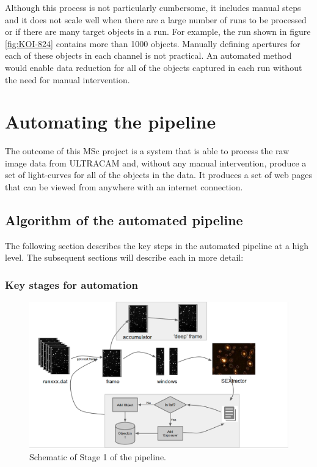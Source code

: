 Although this process is not particularly cumbersome, it includes manual steps and it does not scale well when there are a large number of runs to be processed or if there are many target objects in a run. For example, the run shown in figure \ref{fig:KOI-824} contains more than 1000 objects. Manually defining apertures for each of these objects in each channel is not practical. An automated method would enable data reduction for all of the objects captured in each run without the need for manual intervention. 

\section{Automating the pipeline}
The outcome of this MSc project is a system that is able to process the raw image data from ULTRACAM and, without any manual intervention, produce a set of light-curves for all of the objects in the data. It produces a set of web pages that can be viewed from anywhere with an internet connection. 

\subsection{Algorithm of the automated pipeline} 
The following section describes the key steps in the automated pipeline at a high level. The subsequent sections will describe each in more detail:

\subsubsection{Key stages for automation}

\begin{figure}
	\centering
	\includegraphics[width=130mm]{images/flowchart.png}
	\caption{Schematic of Stage 1 of the pipeline.}
	\label{flowchart}
\end{figure}

